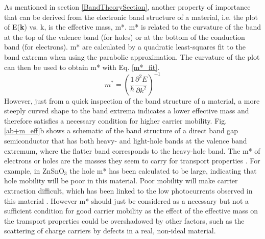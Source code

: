 \documentclass[11pt, twoside]{report}
\begin{document}
As mentioned in section \ref{BandTheorySection}, another property of importance that can be derived from the electronic band structure of a material, i.e. the plot of E(\textbf{k}) vs. k, is the effective mass, m*. m* is related to the curvature of the band at the top of the valence band (for holes) or at the bottom of the conduction band (for electrons). m* are calculated by a quadratic least-squares fit to the band extrema when using the parabolic approximation. The curvature of the plot can then be used to obtain m* with Eq. \ref{m*_fit}.
\begin{equation}\label{m*_fit}
m^* = \left( \frac{1}{\hbar}\frac{\partial^2 E}{\partial k^2} \right)^{-1}
\end{equation}
However, just from a quick inspection of the band structure of a material, a more steeply curved shape to the band extrema indicates a lower effective mass and therefore satisfies a necessary condition for higher carrier mobility. Fig. \ref{ab+m_eff}b shows a schematic of the band structure of a direct band gap semiconductor that has both heavy- and light-hole bands at the valence band extremum, where the flatter band corresponds to the heavy-hole band.
The m* of electrons or holes are the masses they seem to carry for transport properties \cite{dielectric_const1}. For example, in ZnSnO$_3$ the hole m* has been calculated to be large, indicating that hole mobility will be poor in this material. Poor mobility will make carrier extraction difficult, which has been linked to the low photocurrents observed in this material \cite{effective_mass1}.
However m* should just be considered as a necessary but not a sufficient condition for good carrier mobility as the effect of the effective mass on the transport properties could be overshadowed by other factors, such as the scattering of charge carriers by defects in a real, non-ideal material. 
\end{document}
